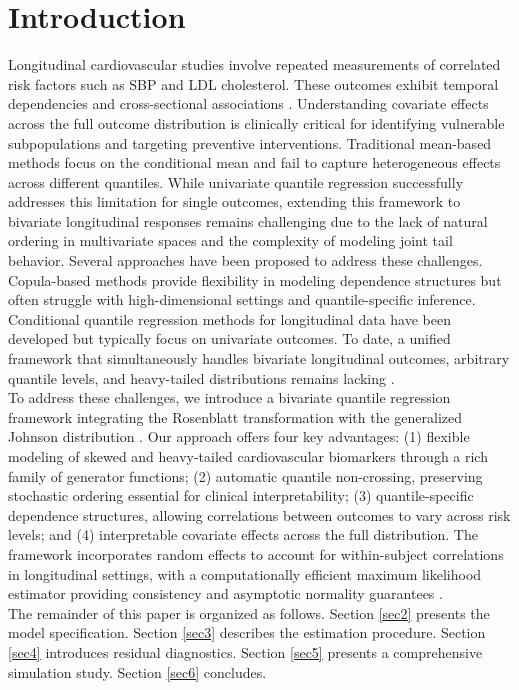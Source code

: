 \documentclass[twoside]{article}
\begin{document}
\section{Introduction} \label{sec1}
Longitudinal cardiovascular studies involve repeated measurements of correlated risk factors such as SBP and LDL cholesterol. These outcomes exhibit temporal dependencies and cross-sectional associations \citep{diggle2002analysis,fieuws2004joint}. Understanding covariate effects across the full outcome distribution is clinically critical for identifying vulnerable subpopulations and targeting preventive interventions. %
Traditional mean-based methods \citep{verbeke1997linear, fitzmaurice2004applied} focus on the conditional mean and fail to capture heterogeneous effects across different quantiles. While univariate quantile regression \citep{koenker1978regression} successfully addresses this limitation for single outcomes, extending this framework to bivariate longitudinal responses remains challenging due to the lack of natural ordering in multivariate spaces and the complexity of modeling joint tail behavior. 
Several approaches have been proposed to address these challenges. Copula-based methods \citep{nelsen2006introduction, joe2014dependence} provide flexibility in modeling dependence structures but often struggle with high-dimensional settings and quantile-specific inference. Conditional quantile regression methods for longitudinal data \citep{ lai2017quantile, tourani.et.al.2025} have been developed but typically focus on univariate outcomes. To date, a unified framework that simultaneously handles bivariate longitudinal outcomes, arbitrary quantile levels, and heavy-tailed distributions remains lacking \citep{geraci2012quantile, chen2021quantile,sabet2025}.\\
To address these challenges, we introduce a bivariate quantile regression framework integrating the Rosenblatt transformation \citep{rosenblatt1952remarks} with the generalized Johnson distribution \citep{tourani2022transformed}. Our approach offers four key advantages: (1) flexible modeling of skewed and heavy-tailed cardiovascular biomarkers through a rich family of generator functions; (2) automatic quantile non-crossing, preserving stochastic ordering essential for clinical interpretability; (3) quantile-specific dependence structures, allowing correlations between outcomes to vary across risk levels; and (4) interpretable covariate effects across the full distribution. The framework incorporates random effects to account for within-subject correlations in longitudinal settings, with a computationally efficient maximum likelihood estimator providing consistency and asymptotic normality guarantees \citep{laird1982random,jiang2017asymptotic}.\\
The remainder of this paper is organized as follows. Section \ref{sec2} presents the model specification. Section \ref{sec3} describes the estimation procedure. Section \ref{sec4} introduces residual diagnostics. Section \ref{sec5} presents a comprehensive simulation study. Section \ref{sec6} concludes.
\end{document}
